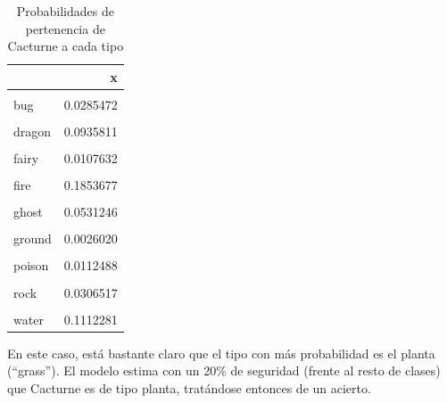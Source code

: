 \documentclass[
  12pt,
]{extreport}
\begin{document}
\begin{table}[H]
\centering
\caption{Probabilidades de pertenencia de Cacturne a cada tipo}
\centering
\fontsize{9}{11}\selectfont
\begin{tabular}[t]{lr}
\toprule
  & x\\
\midrule
\cellcolor{gray!10}{normal} & \cellcolor{gray!10}{0.0154589}\\
bug & 0.0285472\\
\cellcolor{gray!10}{dark} & \cellcolor{gray!10}{0.0614757}\\
dragon & 0.0935811\\
\cellcolor{gray!10}{electric} & \cellcolor{gray!10}{0.1219582}\\
\addlinespace
fairy & 0.0107632\\
\cellcolor{gray!10}{fighting} & \cellcolor{gray!10}{0.0024026}\\
fire & 0.1853677\\
\cellcolor{gray!10}{flying} & \cellcolor{gray!10}{0.0032064}\\
ghost & 0.0531246\\
\addlinespace
\cellcolor{gray!10}{grass} & \cellcolor{gray!10}{0.1950285}\\
ground & 0.0026020\\
\cellcolor{gray!10}{ice} & \cellcolor{gray!10}{0.0114067}\\
poison & 0.0112488\\
\cellcolor{gray!10}{psychic} & \cellcolor{gray!10}{0.0439178}\\
\addlinespace
rock & 0.0306517\\
\cellcolor{gray!10}{steel} & \cellcolor{gray!10}{0.0180308}\\
water & 0.1112281\\
\bottomrule
\end{tabular}
\end{table}

En este caso, está bastante claro que el tipo con más probabilidad es el
planta (``grass''). El modelo estima con un 20\% de seguridad (frente al
resto de clases) que Cacturne es de tipo planta, tratándose entonces de
un acierto.
\end{document}
